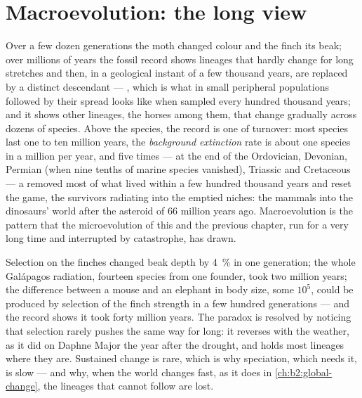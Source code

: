\section{Macroevolution: the long view}

\begin{proposition}\label{prop:b2:speciation:tempo}
Over a few dozen generations the moth changed colour and the finch
its beak; over millions of years the fossil record shows lineages
that hardly change for long stretches and then, in a geological
instant of a few thousand years, are replaced by a distinct
descendant --- \emph{}, which is what
 in small peripheral populations followed by
their spread looks like when sampled every hundred thousand years;
and it shows other lineages, the horses among them, that change
gradually across dozens of species. Above the species, the record
is one of turnover: most species last one to ten million years,
the \emph{background extinction} rate is about one species in a
million per year, and five times --- at the end of the Ordovician,
Devonian, Permian (when nine tenths of marine species vanished),
Triassic and Cretaceous --- a \emph{} removed most of
what lived within a few hundred thousand years and reset the game,
the survivors radiating into the emptied niches: the mammals into
the dinosaurs' world after the asteroid of 66 million years ago.
Macroevolution is the pattern that the microevolution of this and
the previous chapter, run for a very long time and interrupted by
catastrophe, has drawn.
\end{proposition}

\begin{example}\label{ex:b2:speciation:rates}
Selection on the finches changed beak depth by \qty{4}{\%} in one
generation; the whole Galápagos radiation, fourteen species from
one founder, took two million years; the difference between a mouse
and an elephant in body size, some $10^{5}$, could be produced by
selection of the finch strength in a few hundred generations ---
and the record shows it took forty million years. The paradox is
resolved by noticing that selection rarely pushes the same way for
long: it reverses with the weather, as it did on Daphne Major the
year after the drought, and  holds most
lineages where they are. Sustained change is rare, which is why
speciation, which needs it, is slow --- and why, when the world
changes fast, as it does in \cref{ch:b2:global-change}, the
lineages that cannot follow are lost.
\end{example}

